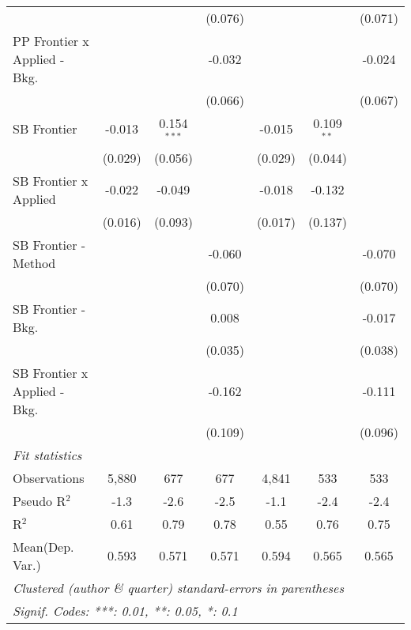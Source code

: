 \begin{tabular}{lcccccc}
                                  &              &               & (0.076)       &             &              & (0.071)\\   
   PP Frontier x Applied - Bkg.   &              &               & -0.032        &             &              & -0.024\\   
                                  &              &               & (0.066)       &             &              & (0.067)\\   
   SB Frontier                    & -0.013       & 0.154$^{***}$ &               & -0.015      & 0.109$^{**}$ &   \\   
                                  & (0.029)      & (0.056)       &               & (0.029)     & (0.044)      &   \\   
   SB Frontier x Applied          & -0.022       & -0.049        &               & -0.018      & -0.132       &   \\   
                                  & (0.016)      & (0.093)       &               & (0.017)     & (0.137)      &   \\   
   SB Frontier - Method           &              &               & -0.060        &             &              & -0.070\\   
                                  &              &               & (0.070)       &             &              & (0.070)\\   
   SB Frontier - Bkg.             &              &               & 0.008         &             &              & -0.017\\   
                                  &              &               & (0.035)       &             &              & (0.038)\\   
   SB Frontier x Applied - Bkg.   &              &               & -0.162        &             &              & -0.111\\   
                                  &              &               & (0.109)       &             &              & (0.096)\\   
   \midrule
   \emph{Fit statistics}\\
   Observations                   & 5,880        & 677           & 677           & 4,841       & 533          & 533\\  
   Pseudo R$^2$                   & -1.3         & -2.6          & -2.5          & -1.1        & -2.4         & -2.4\\  
   R$^2$                          & 0.61         & 0.79          & 0.78          & 0.55        & 0.76         & 0.75\\  
Mean(Dep. Var.) & 0.593 & 0.571 & 0.571 & 0.594 & 0.565 & 0.565 \\
   \midrule \midrule
   \multicolumn{7}{l}{\emph{Clustered (author \& quarter) standard-errors in parentheses}}\\
   \multicolumn{7}{l}{\emph{Signif. Codes: ***: 0.01, **: 0.05, *: 0.1}}\\
\end{tabular}
\par\endgroup
